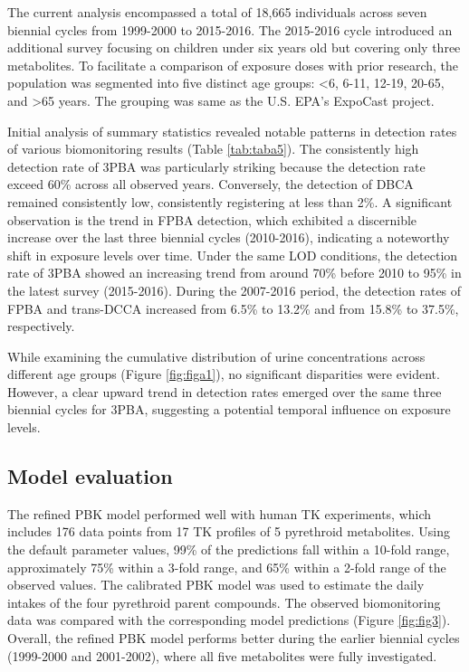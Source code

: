 \documentclass[toxics,article,submit,pdftex,moreauthors]{Definitions/mdpi}
\begin{document}
The current analysis encompassed a total of 18,665 individuals across
seven biennial cycles from 1999-2000 to 2015-2016. The 2015-2016 cycle
introduced an additional survey focusing on children under six years old
but covering only three metabolites. To facilitate a comparison of
exposure doses with prior research, the population was segmented into
five distinct age groups: \textless6, 6-11, 12-19, 20-65, and
\textgreater65 years. The grouping was same as the U.S. EPA's ExpoCast
project.

Initial analysis of summary statistics revealed notable patterns in
detection rates of various biomonitoring results (Table
\ref{tab:taba5}). The consistently high detection rate of 3PBA was
particularly striking because the detection rate exceed 60\% across all
observed years. Conversely, the detection of DBCA remained consistently
low, consistently registering at less than 2\%. A significant
observation is the trend in FPBA detection, which exhibited a
discernible increase over the last three biennial cycles (2010-2016),
indicating a noteworthy shift in exposure levels over time. Under the
same LOD conditions, the detection rate of 3PBA showed an increasing
trend from around 70\% before 2010 to 95\% in the latest survey
(2015-2016). During the 2007-2016 period, the detection rates of FPBA
and trans-DCCA increased from 6.5\% to 13.2\% and from 15.8\% to 37.5\%,
respectively.

While examining the cumulative distribution of urine concentrations
across different age groups (Figure \ref{fig:figa1}), no significant
disparities were evident. However, a clear upward trend in detection
rates emerged over the same three biennial cycles for 3PBA, suggesting a
potential temporal influence on exposure levels.

\subsection{Model evaluation}\label{model-evaluation}

The refined PBK model performed well with human TK experiments, which
includes 176 data points from 17 TK profiles of 5 pyrethroid
metabolites. Using the default parameter values, 99\% of the predictions
fall within a 10-fold range, approximately 75\% within a 3-fold range,
and 65\% within a 2-fold range of the observed values. The calibrated
PBK model was used to estimate the daily intakes of the four pyrethroid
parent compounds. The observed biomonitoring data was compared with the
corresponding model predictions (Figure \ref{fig:fig3}). Overall, the
refined PBK model performs better during the earlier biennial cycles
(1999-2000 and 2001-2002), where all five metabolites were fully
investigated.
\end{document}
